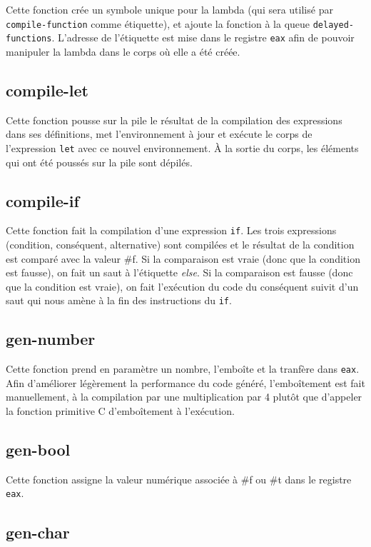 \documentclass[11pt]{report}
\begin{document}
Cette fonction crée un symbole unique pour la lambda (qui sera utilisé
par {\tt compile-function} comme étiquette), et ajoute la fonction à
la queue {\tt delayed-functions}.  L'adresse de l'étiquette est mise
dans le registre {\tt eax} afin de pouvoir manipuler la lambda dans le
corps où elle a été créée.

\subsection{compile-let}

Cette fonction pousse sur la pile le résultat de la compilation des
expressions dans ses définitions, met l'environnement à jour et
exécute le corps de l'expression {\tt let} avec ce nouvel
environnement.  À la sortie du corps, les éléments qui ont été poussés
sur la pile sont dépilés.

\subsection{compile-if}

Cette fonction fait la compilation d'une expression {\tt if}. Les
trois expressions (condition, conséquent, alternative) sont compilées
et le résultat de la condition est comparé avec la valeur \#f. Si la
comparaison est vraie (donc que la condition est fausse), on fait un
saut à l'étiquette {\it else}. Si la comparaison est fausse (donc que
la condition est vraie), on fait l'exécution du code du conséquent
suivit d'un saut qui nous amène à la fin des instructions du {\tt if}.

\subsection{gen-number}

Cette fonction prend en paramètre un nombre, l'emboîte et la tranfère
dans {\tt eax}. Afin d'améliorer légèrement la performance du code
généré, l'emboîtement est fait manuellement, à la compilation par une
multiplication par 4 plutôt que d'appeler la fonction primitive C
d'emboîtement à l'exécution.

\subsection{gen-bool}

Cette fonction assigne la valeur numérique associée à \#f ou \#t dans
le registre {\tt eax}.

\subsection{gen-char}
\end{document}
